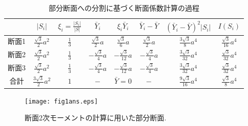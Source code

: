 \documentclass[10pt,a4j]{jarticle}
\begin{document}
\begin{table}
\begin{center}
	\caption{部分断面への分割に基づく断面係数計算の過程}
	\begin{tabular}{c||c|c|c|c|c|c|c}
		&
		$\left| S_i \right|$ & 
		$ \xi_i=\frac{\left| S_i \right|}{\left| S\right|} $  &
		$ \bar{Y}_i $ & 
		$ \xi_i\bar{Y}_i $ & 
		$\bar{Y}_i -\bar Y$ & 
		$ \left(\bar{Y}_i -\bar Y\right)^2\left| S_i \right|$ & 
		$ I(S_i)$  
		\\
		\hline 
		\hline 
		断面1&	
		$\frac{\sqrt{3}}{2}a^2$ & 
		$\frac{1}{3}$  &
		$\frac{\sqrt{3}}{2}a$ & 
		$\frac{\sqrt{3}}{6}a$ & 
		$\frac{\sqrt{3}}{2}a$ & 
		$\frac{3\sqrt{3}}{8}a^4$ &
		$\frac{\sqrt{3}}{16}a^4$ 
		\\
		\hline
		断面2&	
		$\frac{\sqrt{3}}{2}a^2$ & 
		$\frac{1}{3}$  &
		$-\frac{\sqrt{3}}{4}a$ & 
		$-\frac{\sqrt{3}}{12}a $ & 
		$-\frac{\sqrt{3}}{4}a$ & 
		$\frac{3\sqrt{3}}{32}a^4$ &
		$\frac{\sqrt{3}}{32}a^4$ 
		\\
		\hline 
		断面3&	
		$\frac{\sqrt{3}}{2}a^2$ & 
		$\frac{1}{3}$  &
		$-\frac{\sqrt{3}}{4}a$ & 
		$-\frac{\sqrt{3}}{12}a $ & 
		$-\frac{\sqrt{3}}{4}a$ & 
		$\frac{3\sqrt{3}}{32}a^4$ &
		$\frac{\sqrt{3}}{32}a^4$ 
		\\
		\hline 
		\hline 
		合計&	
		$\frac{3\sqrt{3}}{2}a^2$ & 
		$1$  &
		$-$ & 
		$\bar Y=0 $ & 
		$-$ & 
		$\frac{9\sqrt{3}}{16}a^4$ & 
		$\frac{\sqrt{3}}{8}a^4$ 
	\end{tabular}
\label{tbl:tbl2}
\end{center}
\end{table}
\begin{figure}[h]
	\begin{center}
	\texttt{[image: fig1ans.eps]} 
	\end{center}
	\caption{断面2次モーメントの計算に用いた部分断面.} 
	\label{fig:fig1}
\end{figure}
\end{document}
